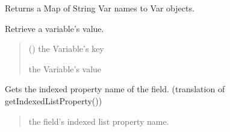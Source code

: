 \documentclass[letterpaper,10pt,english]{sphinxmanual}
\begin{document}
\begin{fulllineitems}
\begin{fulllineitems}
\label{\detokenize{apache_commons_validator_python:apache_commons_validator_python.field_new.Field.get_var_map}}
\pysigstartsignatures
{}
\pysigstopsignatures
\sphinxAtStartPar
Returns a Map of String Var names to Var objects.

\end{fulllineitems}


\begin{fulllineitems}
\label{\detokenize{apache_commons_validator_python:apache_commons_validator_python.field_new.Field.get_var_value}}
\pysigstartsignatures
{}
\pysigstopsignatures
\sphinxAtStartPar
Retrieve a variable’s value.
\begin{quote}\begin{description}
\sphinxAtStartPar
{} () \textendash{} the Variable’s key

\sphinxAtStartPar
the Variable’s value

\end{description}\end{quote}

\end{fulllineitems}


\begin{fulllineitems}
\label{\detokenize{apache_commons_validator_python:apache_commons_validator_python.field_new.Field.indexed_list_property}}
\pysigstartsignatures
{}
\pysigstopsignatures
\sphinxAtStartPar
Gets the indexed property name of the field. (translation of
getIndexedListProperty())
\begin{quote}\begin{description}
\sphinxAtStartPar
the field’s indexed list property name.


\end{description}
\end{quote}
\end{fulllineitems}
\end{fulllineitems}
\end{document}

